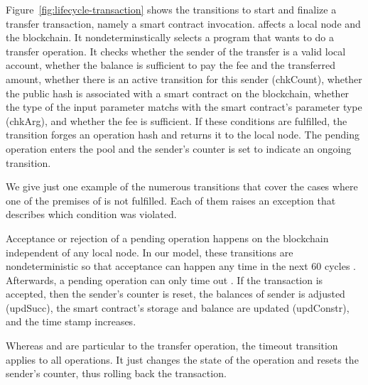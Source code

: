 \documentclass[runningheads]{llncs}
\begin{document}
Figure~\ref{fig:lifecycle-transaction} shows the transitions to start
and finalize a transfer transaction, namely a smart contract invocation.
 affects a local node and the blockchain. It
nondeterminstically selects a program that wants to do a transfer
operation. It
checks whether the sender of the transfer is a valid local account, whether
the balance is sufficient to pay the fee and the transferred amount,
whether there is an active transition for this sender (chkCount),
whether the public hash is associated with a smart contract on the blockchain, whether the type of the input parameter matchs with the smart contract's parameter type (chkArg), and whether the fee is
sufficient. If these conditions are fulfilled, the transition forges
an operation hash and returns it to the local node. 
The pending operation enters the pool and the sender's counter is set
to indicate an ongoing transition.

We give just one example  of the numerous
transitions that cover the cases where one of the 
premises of  is not fulfilled. Each of them
raises an exception that describes which condition was violated.

Acceptance or rejection of a pending operation happens on the
blockchain independent of any local node. In our model, these
transitions are nondeterministic so that acceptance can happen any
time in the next 60 cycles . Afterwards, a
pending operation can only time out .
If the transaction is accepted, then the sender's counter is reset,
the balances of sender is adjusted (updSucc), the smart contract's storage and balance are updated (updConstr), and the time stamp increases.

Whereas  and  are
particular to the transfer operation, the timeout transition applies
to all operations. It just changes the state of the operation and
resets the sender's counter, thus rolling back the transaction.

\end{document}
